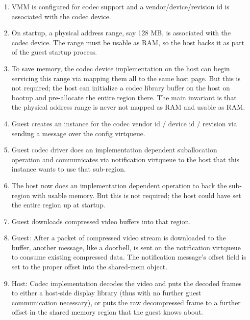 \begin{enumerate}

\item VMM is configured for codec support and a vendor/device/revision id is associated
    with the codec device.

\item On startup, a physical address range, say 128 MB, is associated with the codec device.
    The range must be usable as RAM, so the host backs it as part of the guest startup process.

\item To save memory, the codec device implementation on the host
    can begin servicing this range via mapping them all to the same host page. But this is not required;
        the host can initialize a codec library buffer on the host on bootup and pre-allocate the entire region there.
        The main invariant is that the physical address range is never not mapped as RAM and usable as RAM.

\item Guest creates an instance for the codec vendor id / device id / revision
    via sending a message over the config virtqueue.

\item Guest codec driver does an implementation dependent suballocation operation and communicates via
    notification virtqueue to the host that this instance wants to use that sub-region.

\item The host now does an implementation dependent operation to back the sub-region with usable memory.
    But this is not required; the host could have set the entire region up at startup.

\item Guest downloads compressed video buffers into that region.

\item Guest: After a packet of compressed video stream is downloaded to the
    buffer, another message, like a doorbell, is sent on the notification virtqueue to
        consume existing compressed data. The notification message's offset field is
        set to the proper offset into the shared-mem object.

\item Host: Codec implementation decodes the video and puts the decoded frames
    to either a host-side display library (thus with no further guest
        communication necessary), or puts the raw decompressed frame to a
        further offset in the shared memory region that the guest knows about.


\end{enumerate}
